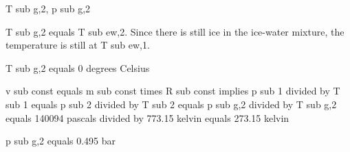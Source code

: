 T sub g,2, p sub g,2

T sub g,2 equals T sub ew,2. Since there is still ice in the ice-water mixture, the temperature is still at T sub ew,1.

T sub g,2 equals 0 degrees Celsius

v sub const equals m sub const times R sub const implies p sub 1 divided by T sub 1 equals p sub 2 divided by T sub 2 equals p sub g,2 divided by T sub g,2 equals 140094 pascals divided by 773.15 kelvin equals 273.15 kelvin

p sub g,2 equals 0.495 bar